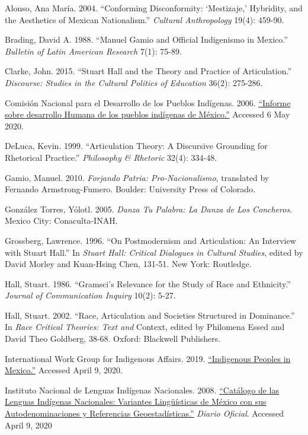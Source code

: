 \documentclass{article}
\begin{document}
\begin{hangparas}{15pt}{1}
 Alonso, Ana María. 2004. ``Conforming Disconformity:
`Mestizaje,' Hybridity, and the Aesthetics of Mexican Nationalism.''
\emph{Cultural Anthropology} 19(4): 459-90.

 Brading, David A. 1988. ``Manuel Gamio and Official
Indigenismo in Mexico.'' \emph{Bulletin of Latin American Research}
7(1): 75-89.

 Clarke, John. 2015. ``Stuart Hall and the Theory and Practice
of Articulation.'' \emph{Discourse: Studies in the Cultural Politics of
Education} 36(2): 275-286.

 Comisión Nacional para el Desarrollo de los Pueblos
Indígenas. 2006.
\href{http://www.cdi.gob.mx/idh/informe_desarrollo_humano_pueblos_indigenas_mexico_2006.pdf}{``Informe
sobre desarrollo Humana de los pueblos indígenas de México.''} Accessed
6 May 2020.

 DeLuca, Kevin. 1999. ``Articulation Theory: A Discursive
Grounding for Rhetorical Practice.'' \emph{Philosophy \& Rhetoric}
32(4): 334-48.

 Gamio, Manuel. 2010. \emph{Forjando Patria:
Pro-Nacionalismo}, translated by Fernando Armstrong-Fumero. Boulder:
University Press of Colorado.

 González Torres, Yólotl. 2005. \emph{Danza Tu Palabra: La
Danza de Los Concheros}. Mexico City: Conaculta-INAH.

 Grossberg, Lawrence. 1996. ``On Postmodernism and
Articulation: An Interview with Stuart Hall.'' In \emph{Stuart Hall:
Critical Dialogues in Cultural Studies}, edited by David Morley and
Kuan-Hsing Chen, 131-51. New York: Routledge.

 Hall, Stuart. 1986. ``Gramsci's Relevance for the Study of
Race and Ethnicity.'' \emph{Journal of Communication Inquiry} 10(2):
5-27.

 Hall, Stuart. 2002. ``Race, Articulation and Societies
Structured in Dominance.'' In \emph{Race Critical Theories: Text and}
Context, edited by Philomena Essed and David Theo Goldberg, 38-68.
Oxford: Blackwell Publishers.

 International Work Group for Indigenous Affairs. 2019.
\href{https://www.iwgia.org/en/mexico.html}{``Indigenous Peoples in
Mexico.''} Accessed April 9, 2020.

 Instituto Nacional de Lenguas Indígenas Nacionales. 2008.
\href{https://www.inali.gob.mx/pdf/CLIN_completo.pdf}{``Catálogo de las
Lenguas Indígenas Nacionales: Variantes Lingüísticas de México con sus
Autodenominaciones y Referencias Geoestadísticas.''} \emph{Diario
Oficial}. Accessed April 9, 2020


\end{hangparas}
\end{document}
